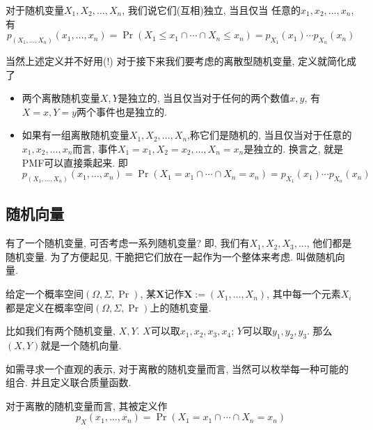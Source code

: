 \documentclass{ctexart}
\begin{document}
\begin{definition}[随机变量的独立性]
    对于随机变量$X_1, X_2, ..., X_n$, 我们说它们(互相)独立, 当且仅当
    任意的$x_1, x_2, ..., x_n$, 有
    $$
p_{\left(X_1, \ldots, X_n\right)}\left(x_1, \ldots, x_n\right)=\operatorname{Pr}\left(X_1\leq x_1 \cap \cdots \cap X_n\leq x_n\right)=p_{X_1}\left(x_1\right) \cdots p_{X_n}\left(x_n\right)
$$
\end{definition}

当然上述定义并不好用(!) 对于接下来我们要考虑的离散型随机变量, 定义就简化成了
\begin{itemize}
    \item 两个离散随机变量$X, Y$是独立的, 当且仅当对于任何的两个数值$x, y$, 有$X=x, Y=y$两个事件也是独立的. 
    \item 如果有一组离散随机变量$X_1, X_2, ..., X_n$,称它们是随机的, 当且仅当对于任意的$x_1,x_2,..., x_n$而言, 事件$X_1=x_1, X_2=x_2, ..., X_n = x_n$是独立的. 换言之, 就是PMF可以直接乘起来. 即
        $$
p_{\left(X_1, \ldots, X_n\right)}\left(x_1, \ldots, x_n\right)=\operatorname{Pr}\left(X_1=x_1 \cap \cdots \cap X_n=x_n\right)=p_{X_1}\left(x_1\right) \cdots p_{X_n}\left(x_n\right)
$$
\end{itemize}

\subsection{随机向量}

有了一个随机变量, 可否考虑一系列随机变量? 即, 我们有$X_1, X_2, X_3, ...$, 他们都是随机变量. 为了方便起见, 干脆把它们放在一起作为一个整体来考虑. 叫做随机向量. 

\begin{definition}[随机向量]
    给定一个概率空间$(\Omega, \Sigma, \operatorname{Pr})$, 某$\boldsymbol X$记作$\boldsymbol{X}:=\left(X_1, \ldots, X_n\right)$, 其中每一个元素$X_i$都是定义在概率空间$(\Omega, \Sigma, \operatorname{Pr})$上的随机变量. 

\end{definition}

\begin{example}
    比如我们有两个随机变量, $X, Y$. $X$可以取$x_1, x_2, x_3, x_4$; $Y$可以取$y_1, y_2, y_3$. 那么$(X,Y)$就是一个随机向量. 
\end{example}

如需寻求一个直观的表示, 对于离散的随机变量而言, 当然可以枚举每一种可能的组合. 并且定义联合质量函数.

\begin{definition}[联合质量函数]
    对于离散的随机变量而言, 其被定义作
    $$
p_X\left(x_1, \ldots, x_n\right)=\operatorname{Pr}\left(X_1=x_1 \cap \cdots \cap X_n=x_n\right)
$$
\end{definition}
\end{document}

